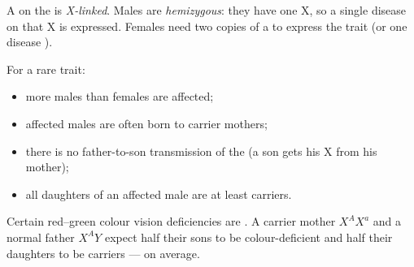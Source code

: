 \begin{definition}\label{def:g11:human-genetics:xlinked}
A  on the  is \emph{X-linked}. Males are
\emph{hemizygous}: they have one X, so a single 
disease  on that X is expressed. Females need two copies of a 
  to express the trait (or one  disease ).
\end{definition}

\begin{proposition}\label{prop:g11:human-genetics:xr}
For a rare   trait:
\begin{itemize}
  \item more males than females are affected;
  \item affected males are often born to carrier mothers;
  \item there is no father-to-son transmission of the   (a son
        gets his X from his mother);
  \item all daughters of an affected male are at least carriers.
\end{itemize}
\end{proposition}
\admitted

\begin{example}\label{ex:g11:human-genetics:colour}
Certain red--green colour vision deficiencies are  . A carrier
mother $X^{A}X^{a}$ and a normal father $X^{A}Y$ expect half their sons to be
colour-deficient and half their daughters to be carriers --- on average.
\end{example}

